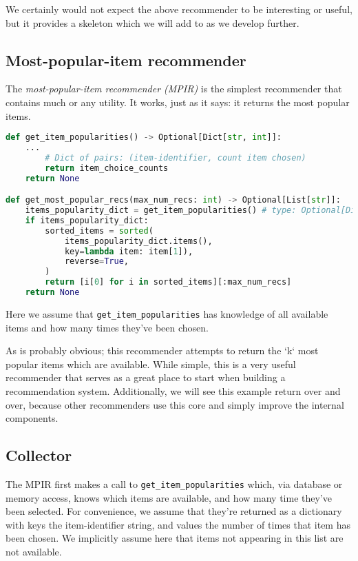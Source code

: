 We certainly would not expect the above recommender to be interesting or useful, but it provides a skeleton which we will add to as we develop further.

\subsection{Most-popular-item recommender}

The \emph{most-popular-item recommender (MPIR)} is the simplest recommender that contains much or any utility. It works, just as it says: it returns the most popular items.

\begin{lstlisting}[language=Python]
def get_item_popularities() -> Optional[Dict[str, int]]:
    ...
        # Dict of pairs: (item-identifier, count item chosen)
        return item_choice_counts 
    return None

def get_most_popular_recs(max_num_recs: int) -> Optional[List[str]]:
    items_popularity_dict = get_item_popularities() # type: Optional[Dict[str, int]]
    if items_popularity_dict:
        sorted_items = sorted(
            items_popularity_dict.items(), 
            key=lambda item: item[1]),
            reverse=True,
        )
        return [i[0] for i in sorted_items][:max_num_recs]
    return None
\end{lstlisting}


Here we assume that \lstinline{get_item_popularities} has knowledge of all available items and how many times they've been chosen.

As is probably obvious; this recommender attempts to return the `k` most popular items which are available. While simple, this is a very useful recommender that serves as a great place to start when building a recommendation system. Additionally, we will see this example return over and over, because other recommenders use this core and simply improve the internal components.

\subsection{Collector}

The MPIR first makes a call to \lstinline{get_item_popularities} which, via database or memory access, knows which items are available, and how many time they've been selected. For convenience, we assume that they're returned as a dictionary with keys the item-identifier string, and values the number of times that item has been chosen. We implicitly assume here that items not appearing in this list are not available.

